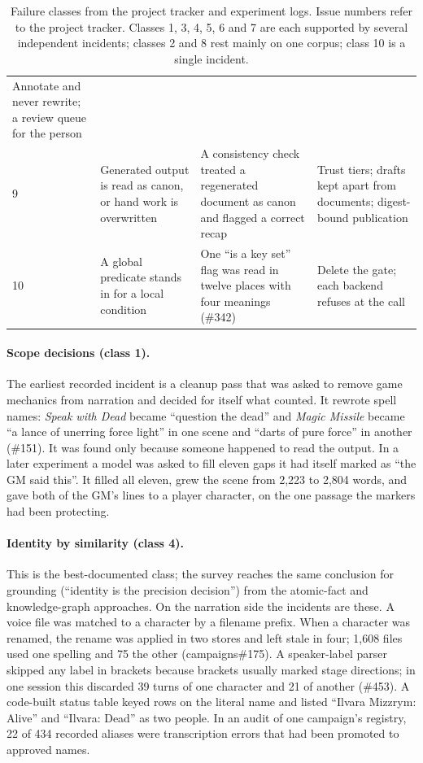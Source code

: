 \documentclass[11pt]{article}
\begin{document}
\begin{table}[t]
\begin{tabularx}{\textwidth}{@{}p{0.4cm}YYY@{}}
Annotate and never rewrite; a review queue for the person \\
9 & Generated output is read as canon, or hand work is overwritten &
A consistency check treated a regenerated document as canon and flagged a correct
recap &
Trust tiers; drafts kept apart from documents; digest-bound publication \\
10 & A global predicate stands in for a local condition &
One ``is a key set'' flag was read in twelve places with four meanings (\#342) &
Delete the gate; each backend refuses at the call \\
\bottomrule
\end{tabularx}
\caption{Failure classes from the project tracker and experiment logs. Issue numbers
refer to the project tracker. Classes 1, 3, 4, 5, 6 and 7 are each supported by several
independent incidents; classes 2 and 8 rest mainly on one corpus; class 10 is a single
incident.}
\label{tab:failures}
\end{table}

\paragraph{Scope decisions (class 1).} The earliest recorded incident is a cleanup pass
that was asked to remove game mechanics from narration and decided for itself what
counted. It rewrote spell names: \emph{Speak with Dead} became ``question the dead'' and
\emph{Magic Missile} became ``a lance of unerring force light'' in one scene and ``darts
of pure force'' in another (\#151). It was found only because someone happened to read
the output. In a later experiment a model was asked to fill eleven gaps it had itself
marked as ``the GM said this''. It filled all eleven, grew the scene from 2{,}223 to
2{,}804 words, and gave both of the GM's lines to a player character, on the one passage
the markers had been protecting.

\paragraph{Identity by similarity (class 4).} This is the best-documented class; the
survey reaches the same conclusion for grounding (``identity is the precision
decision'') from the atomic-fact and knowledge-graph approaches. On the narration side
the incidents are these. A voice
file was matched to a character by a filename prefix. When a character was renamed, the
rename was applied in two stores and left stale in four; 1{,}608 files used one spelling
and 75 the other (campaigns\#175). A speaker-label parser skipped any label in brackets
because brackets usually marked stage directions; in one session this discarded 39 turns
of one character and 21 of another (\#453). A code-built status table keyed rows on the
literal name and listed ``Ilvara Mizzrym: Alive'' and ``Ilvara: Dead'' as two people. In
an audit of one campaign's registry, 22 of 434 recorded aliases were transcription
errors that had been promoted to approved names.
\end{document}
